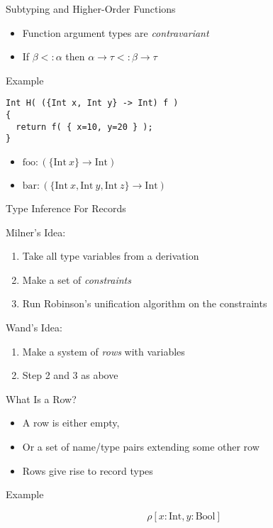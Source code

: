 \documentclass{beamer}
\newcommand{\arr}{\rightarrow}
\newcommand{\oftype}[2]{#1\!:\!#2}
\begin{document}
\begin{frame}[fragile]{Subtyping and Higher-Order Functions}

\onslide<+->
\begin{itemize}
  \item Function argument types are \emph{contravariant}
  \item If $\beta <: \alpha$ then $\alpha \arr \tau <: \beta \arr \tau$
\end{itemize}

\onslide<+->

Example

\begin{verbatim}
Int H( ({Int x, Int y} -> Int) f )
{
  return f( { x=10, y=20 } );
}
\end{verbatim}

\begin{itemize}
  \item $\text{foo} : (\{\text{Int}\ x\} \arr \text{Int})$
  \item $\text{bar} : (\{\text{Int}\ x, \text{Int}\ y, \text{Int}\ z\} \arr \text{Int})$
\end{itemize}

\end{frame}


\begin{frame}{Type Inference For Records}

Milner's Idea:

\begin{enumerate}
  \item Take all type variables from a derivation
  \item Make a set of \emph{constraints}
  \item Run Robinson's unification algorithm on the constraints
\end{enumerate}

Wand's Idea:

\begin{enumerate}
  \item Make a system of \emph{rows} with variables
  \item Step 2 and 3 as above
\end{enumerate}

\end{frame}


\begin{frame}{What Is a Row?}

\begin{itemize}
  \item A row is either empty,
  \item Or a set of name/type pairs extending some other row
  \item Rows give rise to record types
\end{itemize}

Example

\begin{equation*}
  \rho[\oftype{x}{\text{Int}}, \oftype{y}{\text{Bool}}]
\end{equation*}

\end{frame}
\end{document}
